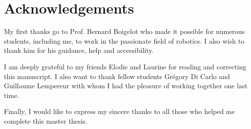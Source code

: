 \clearpage
{}
\setcounter{page}{1}
\chapter*{Acknowledgements}
My first thanks go to Prof. Bernard Boigelot who made it possible for numerous students, including me, to work in the passionate field of robotics. I also wish to thank him for his guidance, help and accessibility.

I am deeply grateful to my friends Elodie and Laurine for reading and correcting this manuscript. I also want to thank fellow students Grégory Di Carlo and Guillaume Lempereur with whom I had the pleasure of working together one last time.

Finally, I would like to express my sincere thanks to all those who helped me complete this master thesis.